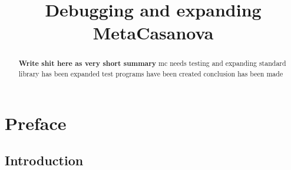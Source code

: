 


\title{Debugging and expanding MetaCasanova}
\author{\writer}

\begin{titlepage}
   
\end{titlepage}

\begin{multicols}{3}

   \begin{abstract}
      \textbf{Write shit here as very short summary}
      mc needs testing and expanding
      standard library has been expanded
      test programs have been created
      conclusion has been made
   \end{abstract}
   \newpage


   \setcounter{tocdepth}{1}
   \tableofcontents
   \cleardoublepage
   \addtocounter{page}{4}


\end{multicols}
\part{Preface}



\begin{multicols}{3}
   \chapter{Introduction}



   

\end{multicols}
